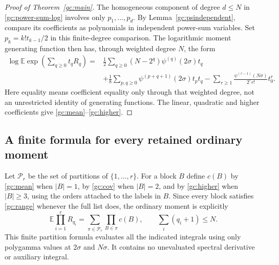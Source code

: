 \documentclass[11pt,a4paper]{article}
\numberwithin{equation}{section}
\theoremstyle{definition}
\theoremstyle{remark}
\begin{document}
\begin{proof}[Proof of Theorem~\ref{gc:main}]
The homogeneous component of degree $d\le N$ in
\eqref{gc:power-sum-log} involves only $p_1,\ldots,p_d$.
By Lemma~\ref{gc:psindependent}, compare its coefficients as polynomials
in independent power-sum variables. Set $p_k=k!t_{k-1}/2$ in this
finite-degree comparison. The logarithmic moment generating function
then has, through weighted degree $N$, the form
\begin{equation}\label{gc:cgf}
\begin{split}
 \log\mathbb E\exp\left(\sum_{q\ge0}t_qR_q\right)
  ={}&\frac12\sum_{q\ge0}(N-2^q)\psi^{(q)}(2\sigma)t_q\\
    &+\frac18\sum_{p,q\ge0}\psi^{(p+q+1)}(2\sigma)t_pt_q
      -\sum_{r\ge1}\frac{\psi^{(r-1)}(N\sigma)}{2^r r!}t_0^r.
\end{split}
\end{equation}
Here equality means coefficient equality only through that weighted
degree, not an unrestricted identity of generating functions.
The linear, quadratic and higher coefficients give
\eqref{gc:mean}--\eqref{gc:higher}.
\end{proof}

\subsection{A finite formula for every retained ordinary moment}

Let $\mathcal P_r$ be the set of partitions of $\{1,\ldots,r\}$.
For a block $B$ define $c(B)$ by \eqref{gc:mean} when $|B|=1$,
by \eqref{gc:cov} when $|B|=2$, and by
\eqref{gc:higher} when $|B|\ge3$, using the orders attached to the
labels in $B$. Since every block satisfies \eqref{gc:range} whenever
the full list does, the ordinary moment is explicitly
\begin{equation}\label{gc:moment}
 \boxed{\qquad
 \mathbb E\prod_{i=1}^rR_{q_i}
             =\sum_{\pi\in\mathcal P_r}\prod_{B\in\pi}c(B),
 \qquad \sum_i(q_i+1)\le N.
 \qquad}
\end{equation}
This finite partition formula evaluates all the indicated integrals
using only polygamma values at $2\sigma$ and $N\sigma$. It contains no
unevaluated spectral derivative or auxiliary integral.
\end{document}
